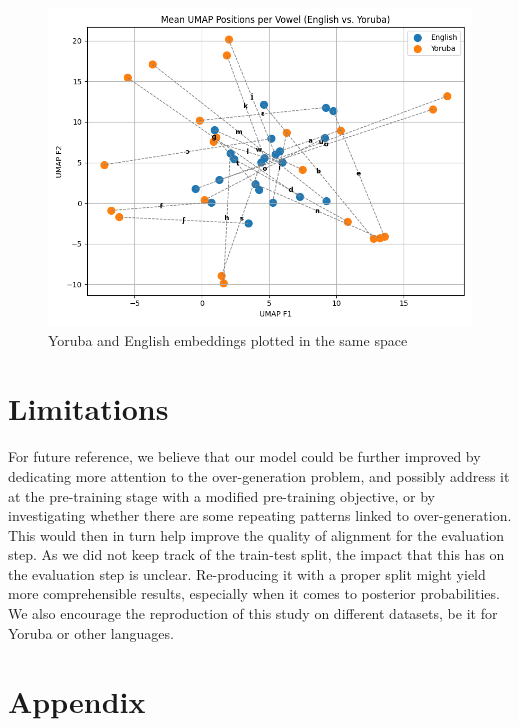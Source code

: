 \documentclass[11pt]{article}
\begin{document}
{\begin{figure}
    \centering
    \includegraphics[width=1\linewidth]{yoruba_eng_plot.png}
    \caption{Yoruba and English embeddings plotted in the same space}
    \label{fig:placeholder}
\end{figure}




\section*{Limitations}

For future reference, we believe that our model could be further improved by dedicating more attention to the over-generation problem, and possibly address it at the pre-training stage with a modified pre-training objective, or by investigating whether there are some repeating patterns linked to over-generation. This would then in turn help improve the quality of alignment for the evaluation step. 
As we did not keep track of the train-test split, the impact that this has on the evaluation step is unclear. Re-producing it with a proper split might yield more comprehensible results, especially when it comes to posterior probabilities. 
We also encourage the reproduction of this study on different datasets, be it for Yoruba or other languages. 

 




\appendix
\section{Appendix}
\label{sec:appendix}
}
\end{document}
